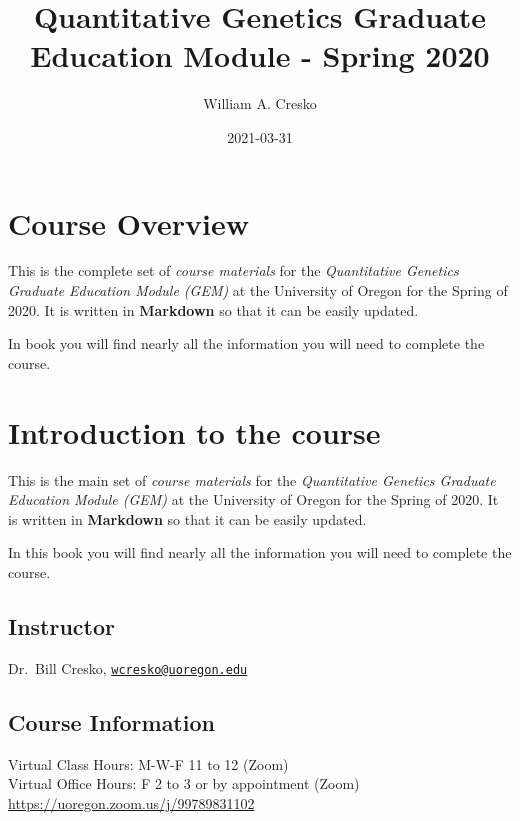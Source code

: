 \documentclass[
]{book}
\title{Quantitative Genetics Graduate Education Module - Spring 2020}
\author{William A. Cresko}
\date{2021-03-31}
\begin{document}
\maketitle

{
\setcounter{tocdepth}{1}
\tableofcontents
}
\hypertarget{course-overview}{%
\chapter{Course Overview}\label{course-overview}}

This is the complete set of \emph{course materials} for the \emph{Quantitative Genetics Graduate Education Module (GEM)} at the University of Oregon for the Spring of 2020. It is written in \textbf{Markdown} so that it can be easily updated.

In book you will find nearly all the information you will need to complete the course.

\hypertarget{introduction-to-the-course}{%
\chapter{Introduction to the course}\label{introduction-to-the-course}}

This is the main set of \emph{course materials} for the \emph{Quantitative Genetics Graduate Education Module (GEM)} at the University of Oregon for the Spring of 2020. It is written in \textbf{Markdown} so that it can be easily updated.

In this book you will find nearly all the information you will need to complete the course.

\hypertarget{instructor}{%
\section{Instructor}\label{instructor}}

Dr.~Bill Cresko, \href{mailto:wcresko@uoregon.edu}{\nolinkurl{wcresko@uoregon.edu}}

\hypertarget{course-information}{%
\section{Course Information}\label{course-information}}

Virtual Class Hours: M-W-F 11 to 12 (Zoom)\\
Virtual Office Hours: F 2 to 3 or by appointment (Zoom)\\
\url{https://uoregon.zoom.us/j/99789831102}
\end{document}
